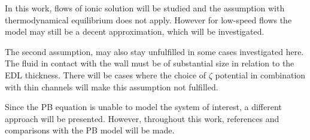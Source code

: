In this work, flows of ionic solution will be studied and the
assumption with thermodynamical equilibrium does not apply. However
for low-speed flows the model may still be a decent approximation,
which will be investigated. 

The second assumption, may also stay unfulfilled in some cases
investigated here. The fluid in contact with the wall must be of
substantial size in relation to the EDL thickness. There will be
cases where the choice of $\zeta$ potential in combination with thin
channels will make this assumption not fulfilled.

Since the PB equation is unable to model the system of
interest, a different approach will be presented. However, throughout
this work, references and comparisons with the PB model will be made. 









